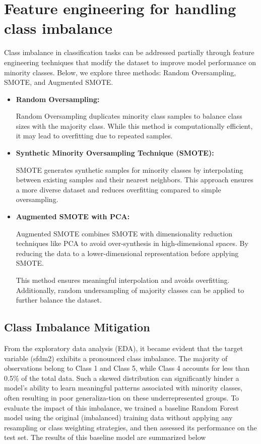 \section{Feature engineering for handling class imbalance}


Class imbalance in classification tasks can be addressed partially through feature engineering
techniques that modify the dataset to improve model performance on minority classes. 
Below, we explore three methods: Random Oversampling, SMOTE, and Augmented SMOTE.

\begin{itemize}
    \item \textbf{Random Oversampling:} 
    
    Random Oversampling duplicates minority class samples to balance class sizes with the majority class.
     While this method is computationally efficient, it may lead to overfitting due to repeated samples.

    \item \textbf{Synthetic Minority Oversampling Technique (SMOTE):} 
    
    SMOTE generates synthetic samples for minority 
    classes by interpolating between existing samples and their nearest neighbors.
    This approach ensures a more diverse dataset and reduces overfitting compared to simple oversampling.

    \item \textbf{Augmented SMOTE with PCA:} 
    
    Augmented SMOTE combines SMOTE with dimensionality reduction techniques like PCA to avoid over-synthesis in high-dimensional spaces. 
    By reducing the data to a lower-dimensional representation before applying SMOTE. 
    
    This method ensures meaningful interpolation and avoids overfitting. 
    Additionally, random undersampling of majority classes can be applied to further balance the dataset.
\end{itemize}

\subsection{Class Imbalance Mitigation}

From the exploratory data analysis (EDA), it became evident that the target variable (sfdm2) exhibits a pronounced class imbalance. 
The majority of observations belong to Class 1 and Class 5, while Class 4 accounts for less than 0.5\% of the total data. 
Such a skewed distribution can significantly hinder a model's ability to learn meaningful patterns associated with minority classes, 
often resulting in poor generaliza-tion on these underrepresented groups. To evaluate the impact of this imbalance, we trained a baseline
Random Forest model using the original (imbalanced) training data without applying any resampling or class weighting strategies, 
and then assessed its performance on the test set.
The results of this baseline model are summarized below


